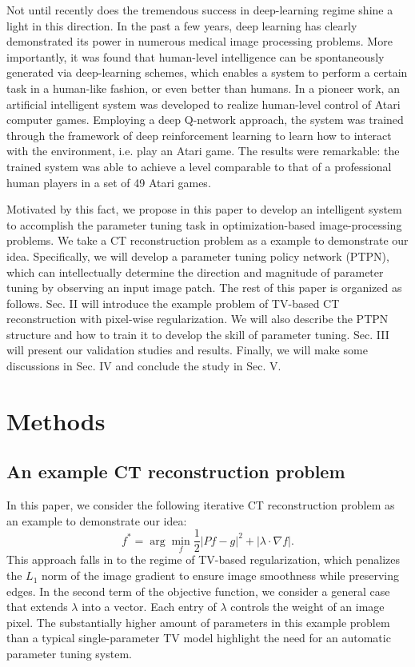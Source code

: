\documentclass[journal]{IEEEtran}
\begin{document}
Not until recently does the tremendous success in deep-learning regime shine a light in this direction. In the past a few years, deep learning has clearly demonstrated its power in numerous medical image processing problems\cite{Han:CoRR:2016,Kang:CoRR:2016,Li:Fully3d:2017,Chen:BOE:2017,Chen:TMI:2017,Cheng:Fully3d:2017}. More importantly, it was found that human-level intelligence can be spontaneously generated via deep-learning schemes, which enables a system to perform a certain task in a human-like fashion, or even better than humans. In a pioneer work, an artificial intelligent system was developed to realize human-level control of Atari computer games\cite{Mnih:Arxiv:2013,Mnih:Nature:2015}. Employing a deep Q-network approach, the system was trained through the framework of deep reinforcement learning to learn how to interact with the environment, i.e. play an Atari game. The results were remarkable: the trained system was able to achieve a level comparable to that of a professional human players in a set of 49 Atari games. 

Motivated by this fact, we propose in this paper to develop an intelligent system to accomplish the parameter tuning task in optimization-based image-processing problems. We take a CT reconstruction problem as a example to demonstrate our idea. Specifically, we will develop a parameter tuning policy network (PTPN), which can intellectually determine the direction and magnitude of parameter tuning by observing an input image patch. The rest of this paper is organized as follows. Sec. II will introduce the example problem of TV-based CT reconstruction with pixel-wise regularization. We will also describe the PTPN structure and how to train it to develop the skill of parameter tuning. Sec. III will present our validation studies and results. Finally, we will make some discussions in Sec. IV and conclude the study in Sec. V.

\section{Methods}

\subsection{An example CT reconstruction problem}
In this paper, we consider the following iterative CT reconstruction problem as an example to demonstrate our idea:
\begin{equation}
\label{Eq:CTrecon}
f^* = \arg\min_f\frac{1}{2}|Pf-g|^2+|\lambda\cdot\nabla f|.
\end{equation}
This approach falls in to the regime of TV-based regularization\cite{Rudin:PhyD:1992}, which penalizes the $L_1$ norm of the image gradient to ensure image smoothness while preserving edges. In the second term of the objective function, we consider a general case that extends $\lambda$ into a vector. Each entry of $\lambda$ controls the weight of an image pixel. The substantially higher amount of parameters in this example problem than a typical single-parameter TV model highlight the need for an automatic parameter tuning system.
\end{document}
